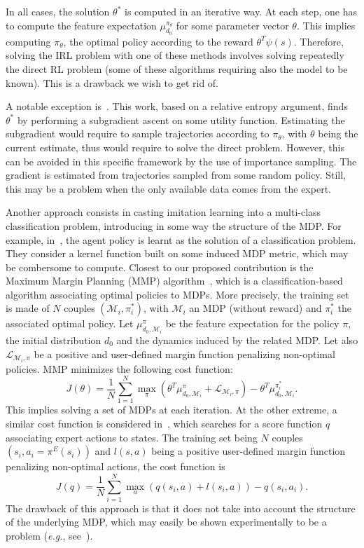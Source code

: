\documentclass{article}
\begin{document}
In all cases, the solution $\theta^*$ is computed in an iterative
way. At each step, one has to compute the feature expectation
$\mu^{\pi_\theta}_{d_0}$ for some parameter vector $\theta$. This
implies computing $\pi_\theta$, the optimal policy according to the
reward $\theta^T\psi(s)$. Therefore, solving the IRL problem with
one of these methods involves solving repeatedly the direct RL
problem (some of these algorithms requiring also the model to be
known). This is a drawback we wish to get rid of.

A notable exception is~\cite{boularias2011relative}. This work,
based on a relative entropy argument, finds $\theta^*$ by performing
a subgradient ascent on some utility function. Estimating the
subgradient would require to sample trajectories according to
$\pi_\theta$, with $\theta$ being the current estimate, thus would
require to solve the direct problem. However, this can be avoided in
this specific framework by the use of importance sampling. The
gradient is estimated from trajectories sampled from some random
policy. Still, this may be a problem when the only available data
comes from the expert.

Another approach consists in casting imitation learning into a
multi-class classification problem, introducing in some way the
structure of the MDP. For example, in~\cite{melo2010learning}, the
agent policy is learnt as the solution of a classification problem.
They consider a kernel function built on some induced MDP metric,
which may be combersome to compute. Closest to our proposed
contribution is the Maximum Margin Planning (MMP)
algorithm~\cite{ratliff2006maximum}, which is a classification-based
algorithm associating optimal policies to MDPs. More precisely, the
training set is made of $N$ couples $(\mathcal{M}_i,\pi^*_i)$, with
$\mathcal{M}_i$ an MDP (without reward) and $\pi_i^*$ the associated
optimal policy. Let $\mu^\pi_{d_0,\mathcal{M}_i}$ be the feature
expectation for the policy $\pi$, the initial distribution $d_0$ and
the dynamics induced by the related MDP. Let also
$\mathcal{L}_{\mathcal{M}_i,\pi}$ be a positive and user-defined
margin function penalizing non-optimal policies. MMP minimizes the
following cost function:
\begin{equation}
  J(\theta) = \frac{1}{N}\sum_{1=1}^N \max_\pi(\theta^T
  \mu^\pi_{d_0,\mathcal{M}_i} + \mathcal{L}_{\mathcal{M}_i,\pi}) - \theta^T
  \mu^{\pi_i^*}_{d_0,\mathcal{M}_i}.\nonumber
\end{equation}
This implies solving a set of MDPs at each iteration. At the other
extreme, a similar cost function is considered
in~\cite{ratliff2007imitation}, which searches for a score function
$q$ associating expert actions to states. The training set being $N$
couples $(s_i,a_i=\pi^E(s_i))$ and $l(s,a)$ being a positive
user-defined margin function penalizing non-optimal actions, the
cost function is
\begin{equation}
  J(q) = \frac{1}{N}\sum_{i=1}^N \max_a (q(s_i,a) +
  l(s_i,a))-q(s_i,a_i).\nonumber
\end{equation}
The drawback of this approach is that it does not take into account
the structure of the underlying MDP, which may easily be shown
experimentally to be a problem (\textit{e.g.},
see~\cite{melo2010learning}).
\end{document}
